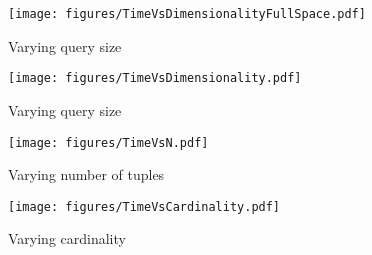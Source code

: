 \begin{figure*}[!ht]
  \vspace{-6mm}
  \begin{minipage}[t]{0.23\linewidth}
    \centering
    \texttt{[image: figures/TimeVsDimensionalityFullSpace.pdf]}
    \vspace{-6mm}
    \caption{Varying query size}
    \label{fig:algorithms}
  \end{minipage}
  \hspace{1mm}
  \begin{minipage}[t]{0.23\linewidth}
    \centering
    \texttt{[image: figures/TimeVsDimensionality.pdf]}
    \vspace{-6mm}
    \caption{Varying query size}
    \label{fig:syn_TimeVsDimension_Dist}
  \end{minipage}
  \hspace{3mm}
  \begin{minipage}[t]{0.23\linewidth}
    \centering
    \texttt{[image: figures/TimeVsN.pdf]}
    \vspace{-6mm}
    \caption{Varying number of tuples} 
    \label{fig:syn_TimeVsN}
  \end{minipage}
  \begin{minipage}[t]{0.25\linewidth}
    \centering
    \texttt{[image: figures/TimeVsCardinality.pdf]}
    \vspace{-2mm}
    \caption{Varying cardinality}
    \label{fig:syn_TimeVsC}
  \end{minipage}
\end{figure*}


